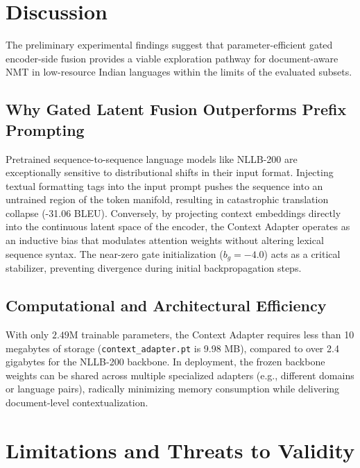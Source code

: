 \documentclass[conference]{IEEEtran}
\begin{document}
\section{Discussion}
\label{sec:discussion}

The preliminary experimental findings suggest that parameter-efficient gated encoder-side fusion provides a viable exploration pathway for document-aware NMT in low-resource Indian languages within the limits of the evaluated subsets. 

\subsection{Why Gated Latent Fusion Outperforms Prefix Prompting}
Pretrained sequence-to-sequence language models like NLLB-200 are exceptionally sensitive to distributional shifts in their input format. Injecting textual formatting tags into the input prompt pushes the sequence into an untrained region of the token manifold, resulting in catastrophic translation collapse (-31.06 BLEU). Conversely, by projecting context embeddings directly into the continuous latent space of the encoder, the Context Adapter operates as an inductive bias that modulates attention weights without altering lexical sequence syntax. The near-zero gate initialization ($b_g = -4.0$) acts as a critical stabilizer, preventing divergence during initial backpropagation steps.

\subsection{Computational and Architectural Efficiency}
With only $2.49\text{M}$ trainable parameters, the Context Adapter requires less than 10 megabytes of storage (\texttt{context\_adapter.pt} is 9.98 MB), compared to over 2.4 gigabytes for the NLLB-200 backbone. In deployment, the frozen backbone weights can be shared across multiple specialized adapters (e.g., different domains or language pairs), radically minimizing memory consumption while delivering document-level contextualization.

\section{Limitations and Threats to Validity}
\label{sec:limitations}
\end{document}
